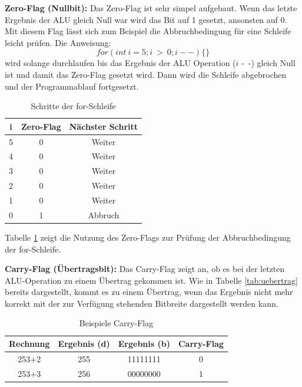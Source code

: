 \documentclass[12pt]{article}
\begin{document}
\par\smallskip\noindent \textbf{Zero-Flag (Nullbit):} Das Zero-Flag ist sehr simpel aufgebaut. Wenn das letzte Ergebnis der ALU gleich Null war wird das Bit auf 1 gesetzt, ansonsten auf 0. Mit diesem Flag lässt sich zum Beispiel die Abbruchbedingung für eine Schleife leicht prüfen. Die Anweisung: $$for(int \ i=5;i \ > \ 0;i--)\{\}$$ wird solange durchlaufen bis das Ergebnis der ALU Operation ($i$ -\ -) gleich Null ist und damit das Zero-Flag gesetzt wird. Dann wird die Schleife abgebrochen und der Programmablauf fortgesetzt. \cite[S.95]{mikroprozessortechnik2011}
\begin{table}[!htb]
\centering
\begin{tabular}{|c|c|c|}
\hline

i & Zero-Flag & Nächster Schritt \\ \hline
5 & 0         & Weiter           \\ \hline
4 & 0         & Weiter           \\ \hline
3 & 0         & Weiter           \\ \hline
2 & 0         & Weiter           \\ \hline
1 & 0         & Weiter           \\ \hline
0 & 1         & Abbruch          \\ \hline
\end{tabular}
\caption{Schritte der for-Schleife}
\label{forschleife}
\end{table}

\noindent Tabelle \ref{forschleife} zeigt die Nutzung des Zero-Flags zur Prüfung der Abbruchbedingung der for-Schleife. 

\newpage
\noindent \textbf{Carry-Flag (Übertragsbit):} Das Carry-Flag zeigt an, ob es bei der letzten ALU-Operation zu einem Übertrag gekommen ist. Wie in Tabelle \ref{tab:uebertrag} bereits dargestellt, kommt es zu einem Übertrag, wenn das Ergebnis nicht mehr korrekt mit der zur Verfügung stehenden Bitbreite dargestellt werden kann.\cite[S.95]{mikroprozessortechnik2011}


\begin{table}[!htb]
\centering
\begin{tabular}{|c|c|c|c|}
\hline
Rechnung & Ergebnis (d) & Ergebnis (b) & Carry-Flag \\ \hline \hline
253+2    & 255          & 11111111     & 0          \\ \hline \hline
253+3    & 256          & 00000000     & 1          \\ \hline
\end{tabular}
\caption{Beispiele Carry-Flag}
\label{tab:carry}

\end{table}
\end{document}
